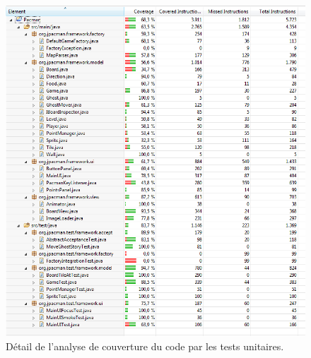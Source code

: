 \documentclass[12pt,a4paper,final]{article}
\begin{document}
\begin{figure}[ht]
	\centering
	\includegraphics[width=\textwidth]{images/CoverageTest.png}
	\caption{\label{CoverageTest}Détail de l'analyse de couverture du code par les tests unitaires.}
\end{figure}





\newpage


\end{document}
